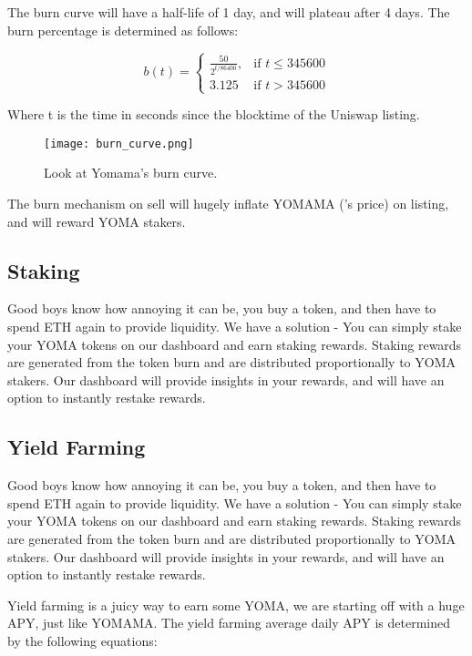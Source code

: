 \documentclass[11pt]{scrartcl} %
\begin{document}
The burn curve will have a half-life of 1 day, and will plateau after 4 days. The burn percentage is determined as follows:

\begin{equation} 
	\label{eq:burn}
		b(t)=
	\begin{cases}
		\frac{50}{2^{t/86400}}, & \text{if } t\leq 345600\\
		3.125	& \text{if } t > 345600
	\end{cases}					
\end{equation}

Where t is the time in seconds since the blocktime of the Uniswap listing.

\begin{figure}[h] %
	\centering
	\texttt{[image: burn\_curve.png]} %
	\caption{Look at Yomama's burn curve.}
\end{figure}

The burn mechanism on sell will hugely inflate YOMAMA ('s price) on listing, and will reward YOMA stakers.

\subsection{Staking}

Good boys know how annoying it can be, you buy a token, and then have to spend ETH again to provide liquidity. We have a solution - You can simply stake your YOMA tokens on our dashboard and earn staking rewards. Staking rewards are generated from the token burn and are distributed proportionally to YOMA stakers. Our dashboard will provide insights in your rewards, and will have an option to instantly restake rewards.

\subsection{Yield Farming}

Good boys know how annoying it can be, you buy a token, and then have to spend ETH again to provide liquidity. We have a solution - You can simply stake your YOMA tokens on our dashboard and earn staking rewards. Staking rewards are generated from the token burn and are distributed proportionally to YOMA stakers. Our dashboard will provide insights in your rewards, and will have an option to instantly restake rewards.

Yield farming is a juicy way to earn some YOMA, we are starting off with a huge APY, just like YOMAMA. 
The yield farming average daily APY is determined by the following equations:
\end{document}
